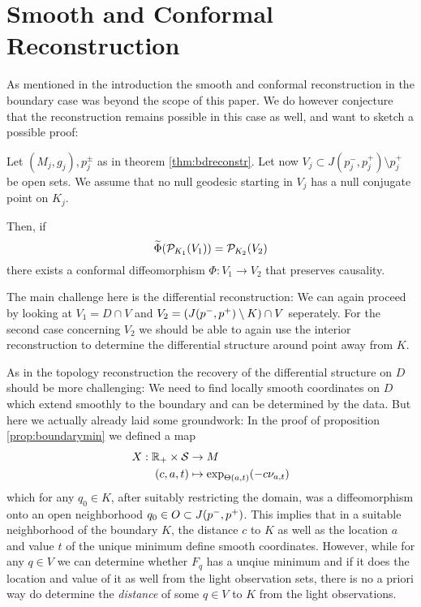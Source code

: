 \section{Smooth and Conformal Reconstruction}
As mentioned in the introduction the smooth and conformal reconstruction in the boundary case was beyond the scope of this paper. We do however conjecture that the reconstruction remains possible in this case as well, and want to sketch a possible proof:
\begin{conjecture}
    Let $(M_j,g_j), p^\pm_j$ as in theorem \ref{thm:bdreconstr}. Let now $V_j\subset J(p_j^-,p_j^+) \setminus p_j^+$ be open sets. We assume that no null geodesic starting in $V_j$ has a null conjugate point on $K_j$. 
    
    Then, if 
    \[
    \widetilde{\Phi}({\mathcal{P}}_{K_1}(V_1)) = {\mathcal{P}}_{K_2}(V_2)
    \]
    there exists a conformal diffeomorphism $\Phi:V_1\to V_2$ that preserves causality.
\end{conjecture}

The main challenge here is the differential reconstruction: We can again proceed by looking at $V_1 = D\cap V$ and $V_2=(J(p^-,p^+) \setminus K)\cap V$ seperately. For the second case concerning $V_2$ we should be able to again use the interior reconstruction to determine the differential structure around point away from $K$.

As in the topology reconstruction the recovery of the differential structure on $D$ should be more challenging: We need to find locally smooth coordinates on $D$ which extend smoothly to the boundary and can be determined by the data. But here we actually already laid some groundwork: In the proof of proposition \ref{prop:boundarymin} we defined a map 
\begin{align*}
    X:\mathbb{R}_+\times {\mathcal{S}} &\to M \\
    (c,a,t)&\mapsto \exp_{\Theta(a,t)}(-c\nu_{a,t})
\end{align*}which for any $q_0\in K$, after suitably restricting the domain, was a diffeomorphism onto an open neighborhood $q_0\in O \subset J(p^-,p^+)$. This implies that in a suitable neighborhood of the boundary $K$, the distance $c$ to $K$ as well as the location $a$ and value $t$ of the unique minimum define smooth coordinates. However, while for any $q\in V$ we can determine whether $F_q$ has a unqiue minimum and if it does the location and value of it as well from the light observation sets, there is no a priori way do determine the \emph{distance} of some $q\in V$ to $K$ from the light observations. 

